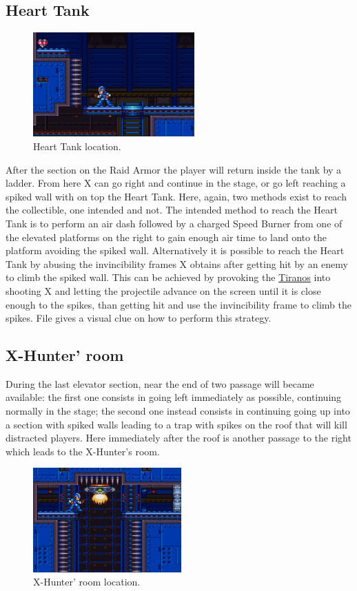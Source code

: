 \subsection{Heart Tank}
\begin{figure}[htp]
	\centering
	\includegraphics[height=4cm]{figures/X2/Wheel_gator/Gator_heart.png}
	\caption{Heart Tank location.}
\end{figure}
After the section on the Raid Armor the player will return inside the tank by a ladder. From here X can go right and continue in the stage, or go left reaching a spiked wall with on top the Heart Tank. Here, again, two methods exist to reach the collectible, one intended and not. The intended method to reach the Heart Tank is to perform an air dash followed by a charged Speed Burner from one of the elevated platforms on the right to gain enough air time to land onto the platform avoiding the spiked wall. Alternatively it is possible to reach the Heart Tank by abusing the invincibility frames X obtains after getting hit by an enemy to climb the spiked wall. This can be achieved by provoking the \hyperlink {enem:Tiranos}{Tiranos} into shooting X and letting the projectile advance on the screen until it is close enough to the spikes, than getting hit and use the invincibility frame to climb the spikes. File  gives a visual clue on how to perform this strategy.


\subsection{X-Hunter' room}
During the last elevator section, near the end of two passage will became available: the first one consists in going left immediately as possible, continuing normally in the stage; the second one instead consists in continuing going up into a section with spiked walls leading to a trap with spikes on the roof that will kill distracted players. Here immediately after the roof is another passage to the right which leads to the X-Hunter's room.
\begin{figure}[htp]
	\centering
	\includegraphics[height=4cm]{figures/X2/Wheel_gator/Gator_Hunter_room.png}
	\caption{X-Hunter' room location.}
\end{figure}

